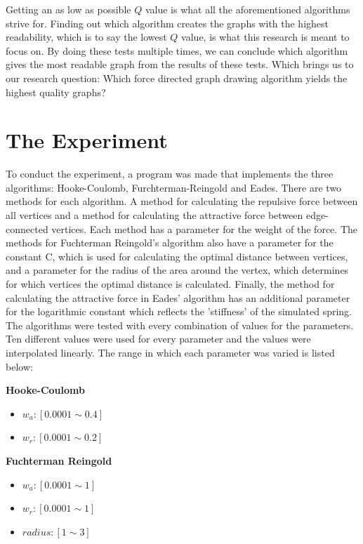 \documentclass[a4paper,12pt]{article}
\begin{document}
    Getting an as low as possible $Q$ value is what all the aforementioned algorithms strive for.
    Finding out which algorithm creates the graphs with the highest readability, which is to say the lowest $Q$ value, is what this research is meant to focus on.
    By doing these tests multiple times, we can conclude which algorithm gives the most readable graph from the results of these tests.
    Which brings us to our research question: Which force directed graph drawing algorithm yields the highest quality graphs?

  \section{The Experiment} %
  To conduct the experiment, a program was made that implements the three algorithms: Hooke-Coulomb, Furchterman-Reingold and Eades. There are two methods for each algorithm. A method for calculating the repulsive force between all vertices and a method for calculating the attractive force between edge-connected vertices. Each method has a parameter for the weight of the force. The methods for Fuchterman Reingold's algorithm also have a parameter for the constant C, which is used for calculating the optimal distance between vertices, and a parameter for the radius of the area around the vertex, which determines for which vertices the optimal distance is calculated. Finally, the method for calculating the attractive force in Eades' algorithm has an additional parameter for the logarithmic constant which reflects the 'stiffness' of the simulated spring. The algorithms were tested with every combination of values for the parameters. Ten different values were used for every parameter and the values were interpolated linearly. The range in which each parameter was varied is listed below:\newline
  
  \textbf{Hooke-Coulomb}
  \begin{itemize}
  	\item $w_{a}: [0.0001 \sim 0.4]$
  	\item $w_{r}: [0.0001 \sim 0.2]$
  \end{itemize}
  
  \textbf{Fuchterman Reingold}
  \begin{itemize}
  	\item $w_{a}: [0.0001 \sim 1]$
  	\item $w_{r}: [0.0001 \sim 1]$
  	\item $radius: [1 \sim 3]$
  \end{itemize}
  
\end{document}
